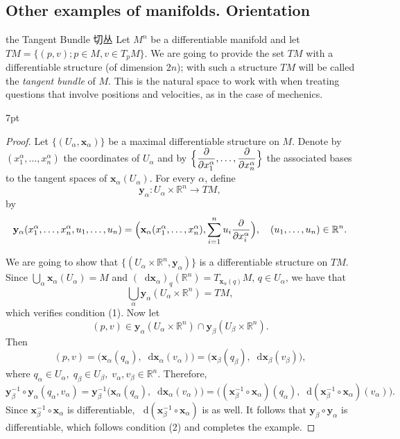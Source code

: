 \documentclass[
	border={25mm 20mm 25mm 30mm},  %
	varwidth,  %
]{standalone}
\newcommand\dd{\mathop{}\!\mathrm{d}}%
\newenvironment{purpleformal}{%
\def\FrameCommand{%
\hspace{1pt}%
{\color{purpleframeshade}\vrule width 2pt}%
{\color{purpleformalshade}\vrule width 4pt}%
\colorbox{purpleformalshade}%
}%
\MakeFramed{\advance\hsize-\width\FrameRestore}%
\noindent\hspace{-4.55pt}%
\begin{adjustwidth}{}{7pt}%
\vspace{1pt}\vspace{1pt}%
}
{%
\vspace{5pt}\end{adjustwidth}\endMakeFramed%
}
\begin{document}
\subsection{Other examples of manifolds. Orientation}

\begin{tips}{the Tangent Bundle 切丛}
    Let \(M^n\) be a differentiable manifold and let \(TM=\bigl\{(p,v);p\in M,v\in T_pM\bigr\}\). We are going to provide the set \(TM\) with a differentiable structure (of dimension \(2n\)); with such a structure \(TM\) will be called the \textsl{tangent bundle} of \(M\). This is the natural space to work with when treating questions that involve positions and velocities, as in the case of mechenics.
\end{tips}

\begin{purpleformal}
    \begin{proof}
        Let \(\bigl\{(U_\alpha,\mathbf{x}_\alpha)\bigr\}\) be a maximal differentiable structure on \(M\). Denote by \((x_1^\alpha,\dots,x_n^\alpha)\) the coordinates of \(U_\alpha\) and by \(\Bigl\{\dfrac{\partial}{\partial x_1^\alpha},\dots,\dfrac{\partial}{\partial x_n^\alpha}\Bigr\}\) the associated bases to the tangent spaces of \(\mathbf{x}_\alpha(U_\alpha)\). For every \(\alpha\), define
        \[\mathbf{y}_\alpha:U_\alpha\times\mathbb{R}^n\to TM,\]
        by
        \[\mathbf{y}_\alpha(x_1^\alpha,\dots,x_n^\alpha,u_1,\dots,u_n)=\Bigl(\mathbf{x}_\alpha(x_1^\alpha,\dots,x_n^\alpha),\sum_{i=1}^{n}{u_i\frac{\partial}{\partial x_i^\alpha}}\Bigr),\quad (u_1,\dots,u_n)\in\mathbb{R}^n.\]

        We are going to show that \(\bigl\{(U_\alpha\times\mathbb{R}^n,\mathbf{y}_\alpha)\bigr\}\) is a differentiable structure on \(TM\). Since \(\bigcup_\alpha\mathbf{x}_\alpha(U_\alpha)=M\) and \((\dd\mathbf{x}_\alpha)_q(\mathbb{R}^n)=T_{\mathbf{x}_\alpha(q)}M\), \(q\in U_\alpha\), we have that
        \[\bigcup_\alpha\mathbf{y}_\alpha(U_\alpha\times\mathbb{R}^n)=TM,\]
        which verifies condition (1). Now let
        \[(p,v)\in\mathbf{y}_\alpha(U_\alpha\times\mathbb{R}^n)\cap\mathbf{y}_\beta(U_\beta\times\mathbb{R}^n).\]
        Then
        \[(p,v)=\bigl(\mathbf{x}_\alpha(q_\alpha),\dd\mathbf{x}_\alpha(v_\alpha)\bigr)=\bigl(\mathbf{x}_\beta(q_\beta),\dd\mathbf{x}_\beta(v_\beta)\bigr),\]
        where \(q_\alpha\in U_\alpha,\;q_\beta\in U_\beta,\; v_\alpha,v_\beta\in\mathbb{R}^n\). Therefore,
        \[\mathbf{y}_\beta^{-1}\circ\mathbf{y}_\alpha(q_\alpha,v_\alpha)=\mathbf{y}_\beta^{-1}\bigl(\mathbf{x}_\alpha(q_\alpha),\dd\mathbf{x}_\alpha(v_\alpha)\bigr)=\bigl((\mathbf{x}_\beta^{-1}\circ\mathbf{x}_\alpha)(q_\alpha),\dd(\mathbf{x}_\beta^{-1}\circ\mathbf{x}_\alpha)(v_\alpha)\bigr).\]
        Since \(\mathbf{x}_\beta^{-1}\circ\mathbf{x}_\alpha\) is differentiable, \(\dd(\mathbf{x}_\beta^{-1}\circ\mathbf{x}_\alpha)\) is as well. It follows that \(\mathbf{y}_\beta\circ\mathbf{y}_\alpha\) is differentiable, which follows condition (2) and completes the example.
    \end{proof}
\end{purpleformal}
\end{document}
